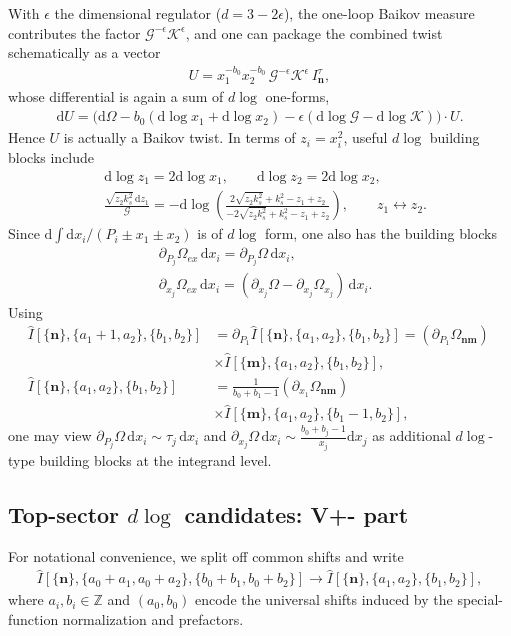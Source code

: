 \documentclass[a4paper]{article}
\newcommand{\n}{\nonumber}
\def\di{{\mathrm{d}}}
\def\ep{\epsilon}
\newcommand{\mG}{\mathcal{G}}
\newcommand{\mK}{\mathcal{K}}
\def\to{\rightarrow}
\begin{document}
With $\ep$ the dimensional regulator ($d=3-2\ep$), the one-loop Baikov measure contributes the factor $\mG^{-\ep}\mK^{\ep}$, and one can package the combined twist schematically as a vector
\begin{align}
	U = x_1^{-b_0}x_2^{-b_0}\,\mG^{-\ep}\mK^{\ep}\,I^{\tau}_{\bm n},
\end{align}
whose differential is again a sum of $d\log$ one-forms,
\begin{align}
	\di U=\Big(\di\Omega-b_0(\di\log x_1+\di\log x_2)-\ep(\di\log \mG-\di\log \mK)\Big)\cdot U.
\end{align}
Hence $U$ is actually a Baikov twist. In terms of $z_i=x_i^2$, useful $d\log$ building blocks include
\begin{align}
	&\di\log z_1=2\di\log x_1,\qquad \di\log z_2=2\di\log x_2,\n\\
	&\frac{\sqrt{z_2 k_s^2}\,\di z_1}{\mG}
	= - \di \log \left(\frac{2 \sqrt{z_2 k_s^2}+k_s^2-z_1+z_2}{-2 \sqrt{z_2 k_s^2}+k_s^2-z_1+z_2}\right),
	\qquad z_1\leftrightarrow z_2.
\end{align}
Since $\di\!\int \di x_i/(P_i\pm x_1\pm x_2)$ is of $d\log$ form, one also has the building blocks
\begin{align}
	&\partial_{P_j}\Omega_{ex}\,\di x_i = \partial_{P_j}\Omega\,\di x_i, \n\\
	&\partial_{x_j}\Omega_{ex}\,\di x_i = (\partial_{x_j}\Omega-\partial_{x_j}\Omega_{x_j})\,\di x_i.
\end{align}
Using
\begin{align}
	\hat{I}[\{\bm{n}\},\{a_1+1,a_2\},\{b_1,b_2\}]
	&=\partial_{P_1}\hat{I}[\{\bm{n}\},\{a_1,a_2\},\{b_1,b_2\}]
	=\left(\partial_{P_1}\Omega_{\bm n\bm m}\right)\,\n\\
	&\times \hat{I}[\{\bm{m}\},\{a_1,a_2\},\{b_1,b_2\}], \n\\
	\hat{I}[\{\bm{n}\},\{a_1,a_2\},\{b_1,b_2\}]
	&=\frac{1}{b_0+b_1-1}\left(\partial_{x_1}\Omega_{\bm n\bm m}\right)\,\n\\
	&\times \hat{I}[\{\bm{m}\},\{a_1,a_2\},\{b_1-1,b_2\}],
\end{align}
one may view $\partial_{P_j}\Omega\,\di x_i\sim \tau_j\,\di x_i$ and
$\partial_{x_j}\Omega\,\di x_i\sim \frac{b_0+b_j-1}{x_j}\di x_j$
as additional $d\log$-type building blocks at the integrand level.

\subsection{Top-sector \texorpdfstring{$d\log$}{$\di \log$} candidates: V+- part}
For notational convenience, we split off common shifts and write
\begin{align}
	\hat{I}[\{\bm n\},\{a_0+a_1,a_0+a_2\},\{b_0+b_1,b_0+b_2\}]\to \hat{I}[\{\bm n\},\{a_1,a_2\},\{b_1,b_2\}],
\end{align}
where $a_i,b_i\in\mathbb Z$ and $(a_0,b_0)$ encode the universal shifts induced by the special-function normalization and prefactors.
\end{document}
